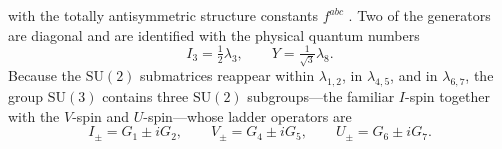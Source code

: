 with the totally antisymmetric structure constants $f^{abc}$ \cite[Ch.~7]{Amsler2018}.
Two of the generators are diagonal and are identified with the physical quantum
numbers
\begin{equation}
    I_3 = \tfrac{1}{2}\lambda_3,
    \qquad
    Y = \tfrac{1}{\sqrt{3}}\lambda_8 .
\end{equation}
Because the $\mathrm{SU}(2)$ submatrices reappear within $\lambda_{1,2}$, in
$\lambda_{4,5}$, and in $\lambda_{6,7}$, the group $\mathrm{SU}(3)$ contains three
$\mathrm{SU}(2)$ subgroups---the familiar $I$-spin together with the $V$-spin and
$U$-spin---whose ladder operators are
\begin{equation}
    I_\pm = G_1 \pm iG_2,
    \qquad
    V_\pm = G_4 \pm iG_5,
    \qquad
    U_\pm = G_6 \pm iG_7 .
\end{equation}

